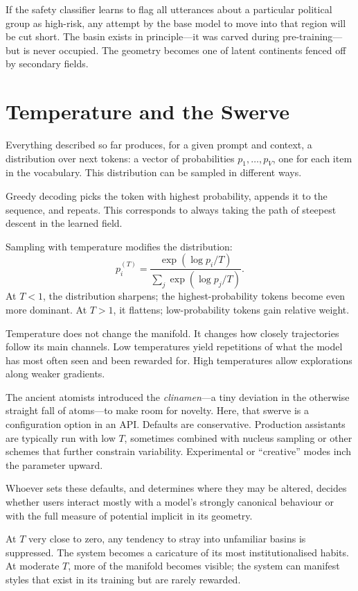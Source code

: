\documentclass[12pt,a4paper]{article}
\begin{document}
If the safety classifier learns to flag all utterances about a particular political group as high-risk, any attempt by the base model to move into that region will be cut short. The basin exists in principle---it was carved during pre-training---but is never occupied. The geometry becomes one of latent continents fenced off by secondary fields.

\section{Temperature and the Swerve}

Everything described so far produces, for a given prompt and context, a distribution over next tokens: a vector of probabilities $p_1,\dots,p_V$, one for each item in the vocabulary. This distribution can be sampled in different ways.

Greedy decoding picks the token with highest probability, appends it to the sequence, and repeats. This corresponds to always taking the path of steepest descent in the learned field.

Sampling with temperature modifies the distribution:
\[
p_i^{(T)} = \frac{\exp(\log p_i / T)}{\sum_j \exp(\log p_j / T)}.
\]
At $T < 1$, the distribution sharpens; the highest-probability tokens become even more dominant. At $T > 1$, it flattens; low-probability tokens gain relative weight.

Temperature does not change the manifold. It changes how closely trajectories follow its main channels. Low temperatures yield repetitions of what the model has most often seen and been rewarded for. High temperatures allow explorations along weaker gradients.

The ancient atomists introduced the \emph{clinamen}---a tiny deviation in the otherwise straight fall of atoms---to make room for novelty. Here, that swerve is a configuration option in an API. Defaults are conservative. Production assistants are typically run with low $T$, sometimes combined with nucleus sampling or other schemes that further constrain variability. Experimental or ``creative'' modes inch the parameter upward.

Whoever sets these defaults, and determines where they may be altered, decides whether users interact mostly with a model's strongly canonical behaviour or with the full measure of potential implicit in its geometry.

At $T$ very close to zero, any tendency to stray into unfamiliar basins is suppressed. The system becomes a caricature of its most institutionalised habits. At moderate $T$, more of the manifold becomes visible; the system can manifest styles that exist in its training but are rarely rewarded.
\end{document}
